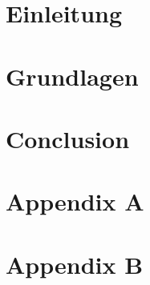 \documentclass[12pt]{report}
\begin{document}

\newpage


\begin{abstract}
    
\end{abstract}


\tableofcontents
\newpage


\listoffigures
\newpage


\chapter{Einleitung}

\newpage


\chapter{Grundlagen}

\newpage


\chapter{Conclusion}

\newpage


\appendix
\chapter{Appendix A}

\newpage

\chapter{Appendix B}

\newpage




\newpage
\end{document}
